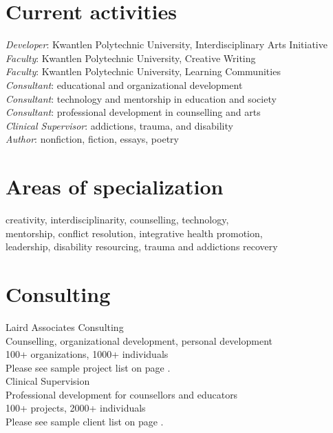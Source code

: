 \documentclass[10pt, a4paper]{article}
\newcommand{\years}[1]{\marginpar{\footnotesize #1}}
\begin{document}
\section*{Current activities}
\emph{Developer}: Kwantlen Polytechnic University, Interdisciplinary Arts Initiative\\
\emph{Faculty}: Kwantlen Polytechnic University, Creative Writing\\
\emph{Faculty}: Kwantlen Polytechnic University, Learning Communities\\
\emph{Consultant}: educational and organizational development\\
\emph{Consultant}: technology and mentorship in education and society\\
\emph{Consultant}: professional development in counselling and arts\\
\emph{Clinical Supervisor}: addictions, trauma, and disability\\
\emph{Author}: nonfiction, fiction, essays, poetry

\section*{Areas of specialization}
creativity, interdisciplinarity, counselling, technology, \\mentorship, conflict resolution,  integrative health promotion, \\leadership, disability resourcing, trauma and addictions recovery

\section*{Consulting}
\noindent
\years{1986--2010}Laird Associates Consulting\\
\textsf{Counselling, organizational development, personal development\\100+ organizations, 1000+ individuals\\Please see sample project list on page \pageref{sample_consulting}}.\\
\years{2000--2010}Clinical Supervision\\
\textsf{Professional development for counsellors and educators\\100+ projects, 2000+ individuals\\Please see sample client list on page \pageref{sample_supervision}}.
\end{document}
